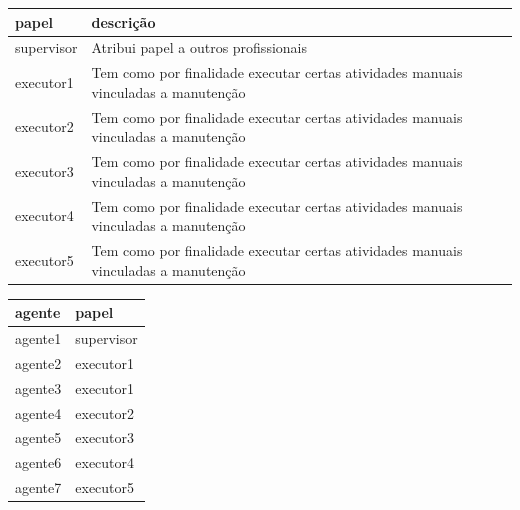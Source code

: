 \documentclass[12pt]{article}
\begin{document}
\begin{table}[H]
\centering
\begin{tabular}{|l|l|}
\hline
\textbf{papel} & \textbf{descrição} \\ \hline
supervisor & Atribui papel a outros profissionais \\ \hline
executor1 & Tem como por finalidade executar certas atividades manuais vinculadas a manutenção \\ \hline
executor2 & Tem como por finalidade executar certas atividades manuais vinculadas a manutenção \\ \hline
executor3 & Tem como por finalidade executar certas atividades manuais vinculadas a manutenção \\ \hline
executor4 & Tem como por finalidade executar certas atividades manuais vinculadas a manutenção \\ \hline
executor5 & Tem como por finalidade executar certas atividades manuais vinculadas a manutenção \\ \hline
\end{tabular}
\end{table}


\begin{table}[H]
\centering
\begin{tabular}{|l|l|}
\hline
\textbf{agente} & \textbf{papel} \\ \hline
agente1 & supervisor \\ \hline
agente2 & executor1 \\ \hline
agente3 & executor1 \\ \hline
agente4 & executor2 \\ \hline
agente5 & executor3 \\ \hline
agente6 & executor4 \\ \hline
agente7 & executor5 \\ \hline
\end{tabular}
\end{table}
\end{document}

